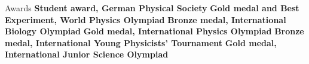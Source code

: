 \begin{rubric}{Awards}
\entry*[2012\hfill] \textbf{Student award, German Physical Society}
\entry*[2011\hfill] \textbf{Gold medal and Best Experiment, World Physics Olympiad}
\entry*[2010\hfill] \textbf{Bronze medal, International Biology Olympiad}
\entry*[2009      ] \textbf{Gold medal, International Physics Olympiad}
\entry*[2009\hfill] \textbf{Bronze medal, International Young Physicists' Tournament}
\entry*[2007-2008\hfill] \textbf{Gold medal, International Junior Science Olympiad}

\end{rubric}
